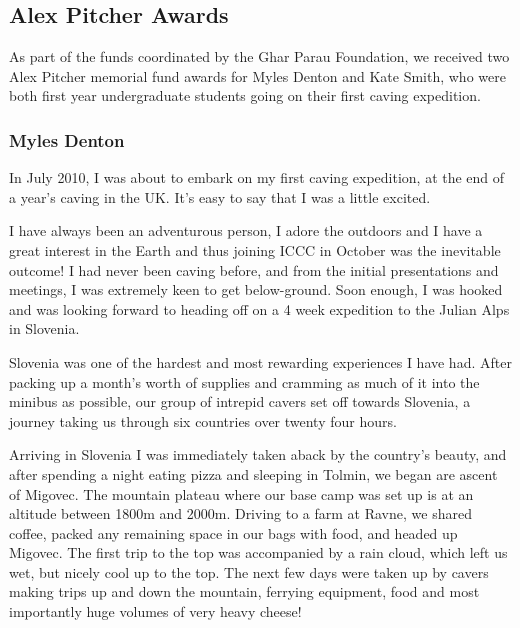 \subsection{Alex Pitcher Awards}

As part of the funds coordinated by the Ghar Parau Foundation, we received two Alex Pitcher
memorial fund awards for Myles Denton and Kate Smith, who were both first year
undergraduate students going on their first caving expedition.

\subsubsection{Myles Denton}

In July 2010, I was about to embark on my first caving expedition, at the end
of a year's caving in the UK.  It's easy to say that I was a little excited.

I have always been an adventurous person, I adore the outdoors and I have a
great interest in the Earth and thus joining ICCC in October was the inevitable
outcome!  I had never been caving before, and from the initial presentations
and meetings, I was extremely keen to get below-ground.  Soon enough, I was
hooked and was looking forward to heading off on a 4 week expedition to the
Julian Alps in Slovenia.

Slovenia was one of the hardest and most rewarding experiences I have had.
After packing up a month's worth of supplies and cramming as much of it into
the minibus as possible, our group of intrepid cavers set off towards Slovenia,
a journey taking us through six countries over twenty four hours.

Arriving in Slovenia I was immediately taken aback by the country's beauty, and
after spending a night eating pizza and sleeping in Tolmin, we began are ascent
of Migovec.  The mountain plateau where our base camp was set up is at an
altitude between 1800m and 2000m.  Driving to a farm at Ravne, we shared
coffee, packed any remaining space in our bags with food, and headed up
Migovec.  The first trip to the top was accompanied by a rain cloud, which left
us wet, but nicely cool up to the top.  The next few days were taken up by
cavers making trips up and down the mountain, ferrying equipment, food and most
importantly huge volumes of very heavy cheese!

